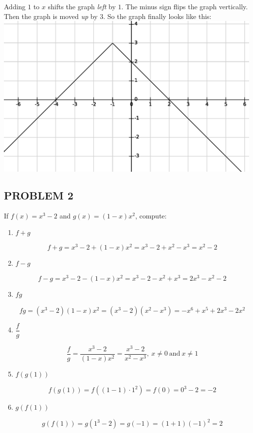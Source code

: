 \documentclass{article}
\begin{document}
\begin{enumerate}[label=(\alph*)]
Adding $1$ to $x$ shifts the graph \textit{left} by $1$. 
The minus sign flips the graph vertically. 
Then the graph is moved \textit{up} by $3$.
So the graph finally looks like this: \\

\includegraphics[scale=0.6]{figure_3}

\end{enumerate}


\subsection*{PROBLEM 2}

If $f(x) = x^3 - 2$ and $g(x) = (1 - x)x^2$, compute:

\begin{enumerate}[label=(\alph*)]

\item $f + g$ 

$$ f+g = x^3-2 + (1-x)x^2 = x^3-2+x^2-x^3 = x^2-2 $$

\item $f - g$

$$ f-g = x^3-2 - (1-x)x^2 = x^3-2-x^2+x^3 = 2x^3-x^2-2 $$

\item $fg$

$$ fg = (x^3-2)(1-x)x^2 = (x^3-2)(x^2-x^3) = -x^6+x^5+2x^3-2x^2 $$

\item $\dfrac{f}{g}$

$$ \dfrac{f}{g} = \dfrac{x^3-2}{(1-x)x^2} = \dfrac{x^3-2}{x^2-x^3},\ 
x \neq 0\ \textrm{and}\ x \neq 1 $$

\item $f(g(1))$

$$ f(g(1)) = f((1-1) \cdot 1^2) = f(0) = 0^3-2 = -2 $$

\item $g(f(1))$

$$ g(f(1)) = g(1^3-2) = g(-1) = (1+1)(-1)^2 = 2 $$

\end{enumerate}
\end{document}
